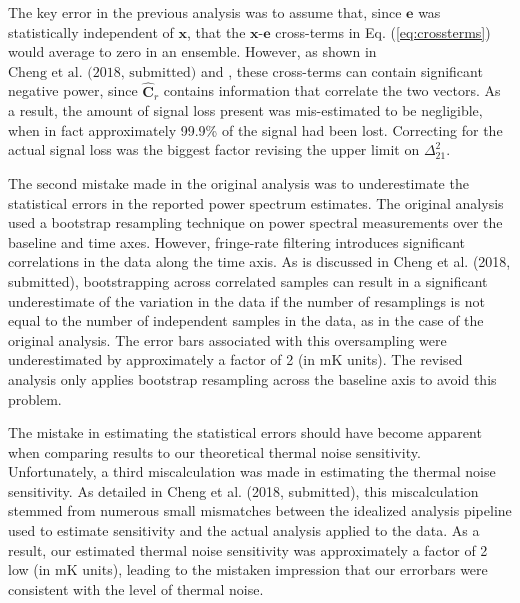 \documentclass[onecolumn]{emulateapj} \shorttitle{}
\newcommand{\chengcitet}{\textrm{Cheng et al. (2018, submitted)}}
\begin{document}
The key error in the previous analysis was to assume that, since $\mathbf e$ was statistically independent of $\mathbf x$, that
the $\mathbf x$-$\mathbf e$ cross-terms in Eq. (\ref{eq:crossterms}) would
average to zero in an ensemble. 
However, as shown in $\chengcitet$ and \citet{switzer_et_al2015}, these cross-terms can contain
significant negative power, since $\widehat{\textbf{C}}_r$ contains information
that correlate the
two vectors.  As a result, the amount of signal loss present was mis-estimated to be negligible, when in fact approximately
99.9\% of the signal had been lost. Correcting for the actual signal loss was the biggest factor revising the upper limit
on $\Delta^2_{21}$.

The second mistake made in the original analysis was to underestimate the statistical errors in the reported power spectrum
estimates.  The original analysis used a bootstrap resampling technique on power spectral measurements over the baseline and time axes.
However, fringe-rate filtering introduces significant correlations in the data
along the time axis.  As is discussed in \chengcitet, bootstrapping across correlated samples can result in a significant underestimate
of the variation in the data if the number of resamplings is not equal to the number of independent samples in the data, as in the case 
of the original analysis. The error bars associated with this oversampling were underestimated by approximately a factor of 2 (in $\textrm{mK}$ units).
The revised analysis only applies bootstrap resampling across the baseline axis to avoid this problem.

The mistake in estimating the statistical errors should have become apparent when comparing results to our theoretical
thermal noise sensitivity.  Unfortunately, a third miscalculation was made in estimating the thermal noise sensitivity.
As detailed in \chengcitet, this miscalculation stemmed from numerous small mismatches between the idealized analysis
pipeline used to estimate sensitivity and the actual analysis applied to the data.  As a result, our estimated thermal
noise sensitivity was approximately a factor of 2 low (in $\textrm{mK}$ units), leading to the mistaken impression that our
errorbars were consistent with the level of thermal noise.
\end{document}
